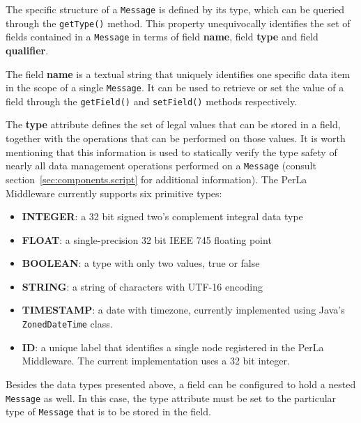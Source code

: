The specific structure of a \texttt{Message} is defined by its type, which can
be queried through the \texttt{getType()} method. This property unequivocally
identifies the set of fields contained in a \texttt{Message} in terms of field
\textbf{name}, field \textbf{type} and field \textbf{qualifier}.

The field \textbf{name} is a textual string that uniquely identifies one
specific data item in the scope of a single \texttt{Message}. It can be used to
retrieve or set the value of a field through the \texttt{getField()} and
\texttt{setField()} methods respectively.

The \textbf{type} attribute defines the set of legal values that can be stored
in a field, together with the operations that can be performed on those values.
It is worth mentioning that this information is used to statically verify
the type safety of nearly all data management operations performed on a
\texttt{Message} (consult section~\ref{sec:components.script} for additional
information). The PerLa Middleware currently supports six primitive types:
\begin{itemize}
  \item \textbf{INTEGER}: a 32 bit signed two's complement integral data type
  \item \textbf{FLOAT}: a single-precision 32 bit IEEE 745 floating point
  \item \textbf{BOOLEAN}: a type with only two values, true or false
  \item \textbf{STRING}: a string of characters with UTF-16 encoding
  \item \textbf{TIMESTAMP}: a date with timezone, currently implemented using
  Java's \texttt{ZonedDateTime} class.
  \item \textbf{ID}: a unique label that identifies a single node registered
  in the PerLa Middleware. The current implementation uses a 32 bit integer. 
\end{itemize}
Besides the data types presented above, a field can be configured to hold a
nested \texttt{Message} as well. In this case, the type attribute must be set
to the particular type of \texttt{Message} that is to be stored in the field. 

